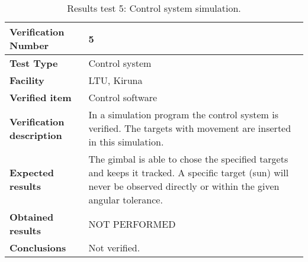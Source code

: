 \begin{table}[H]
\centering

\begin{tabular}{|m{}| m{} |}
\hline
\textbf{Verification Number} 		& 5 				\\ \hline
\textbf{Test Type} 					& Control system	\\ \hline
\textbf{Facility} 					& LTU, Kiruna 		\\ \hline
\textbf{Verified item} 				& Control software 	\\ \hline

\textbf{Verification description} 	& In a simulation program the control system is verified. The targets with movement are inserted in this simulation.\\ \hline

\textbf{Expected results} 			& The gimbal is able to chose the specified targets and keeps it tracked. A specific target (sun) will never be observed directly or within the given angular tolerance. \\ \hline

\textbf{Obtained results} 			& NOT PERFORMED \\ \hline

\textbf{Conclusions} 				& Not verified.		\\ \hline
\end{tabular}
\caption{Results test 5: Control system simulation.}
\label{tab:testresult5:control}
\end{table}


\raggedbottom
